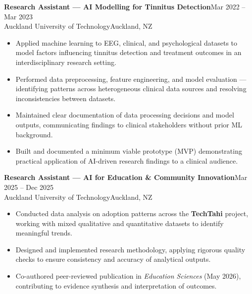 \documentclass[10.5pt,a4paper]{article}
\newenvironment{expbox}{%
  \begin{tcolorbox}[
    blanker, breakable,
    left=10pt,
    borderline west={2.5pt}{0pt}{accentlt},
    before upper={\parskip=2pt},
    top=0pt, bottom=0pt
  ]
}{%
  \end{tcolorbox}\vspace{4pt}
}
\newcommand{\role}[4]{%
  {\bfseries #1}\hfill{\small\color{accent}#2}\\[-1pt]
  {\small\color{mid}#3}\hfill{\small\color{light}#4}\\[3pt]%
}
\begin{document}
\begin{expbox}
\role{Research Assistant — AI Modelling for Tinnitus Detection}
     {Mar 2022 – Mar 2023}
     {Auckland University of Technology}
     {Auckland, NZ}
\begin{itemize}
  \item Applied machine learning to EEG, clinical, and psychological datasets to model
        factors influencing tinnitus detection and treatment outcomes in an interdisciplinary
        research setting.
  \item Performed data preprocessing, feature engineering, and model evaluation —
        identifying patterns across heterogeneous clinical data sources and resolving
        inconsistencies between datasets.
  \item Maintained clear documentation of data processing decisions and model outputs,
        communicating findings to clinical stakeholders without prior ML background.
  \item Built and documented a minimum viable prototype (MVP) demonstrating practical
        application of AI-driven research findings to a clinical audience.
\end{itemize}
\end{expbox}

\begin{expbox}
\role{Research Assistant — AI for Education \& Community Innovation}
     {Mar 2025 – Dec 2025}
     {Auckland University of Technology}
     {Auckland, NZ}
\begin{itemize}
  \item Conducted data analysis on adoption patterns across the \textbf{TechTahi} project,
        working with mixed qualitative and quantitative datasets to identify meaningful trends.
  \item Designed and implemented research methodology, applying rigorous quality checks to
        ensure consistency and accuracy of analytical outputs.
  \item Co-authored peer-reviewed publication in \textit{Education Sciences} (May 2026),
        contributing to evidence synthesis and interpretation of outcomes.
\end{itemize}
\end{expbox}
\end{document}
